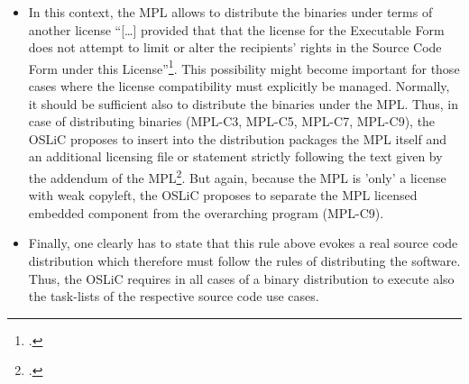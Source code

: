 \begin{itemize}
  \item In this context, the MPL allows to distribute the binaries under terms
  of another license \enquote{[\ldots] provided that that the license for the
  Executable Form does not attempt to limit or alter the recipients’ rights in
  the Source Code Form under this License}\footcite[cf.][\nopage
  wp.\ §3.2.b]{Mpl20OsiLicense2013a}. This possibility might become important for
  those cases where the license compatibility must explicitly be managed.
  Normally, it should be sufficient also to distribute the binaries under the
  MPL. Thus, in case of distributing binaries (MPL-C3, MPL-C5, MPL-C7, MPL-C9), the
  OSLiC proposes to insert into the distribution packages the MPL itself and an
  additional licensing file or statement strictly following the text given by
  the addendum of the MPL\footcite[cf.][\nopage wp.\ Exhibit
  A]{Mpl20OsiLicense2013a}. But again, because the MPL is 'only' a license with
  weak copyleft, the OSLiC proposes to separate the MPL licensed embedded
  component from the overarching program (MPL-C9).
  
  
  \item Finally, one clearly has to state that this rule above evokes a real
  source code distribution which therefore must follow the rules of distributing
  the software. Thus, the OSLiC requires in all cases of a binary distribution
  to execute also the task-lists of the respective source code use cases.

\end{itemize}

%

